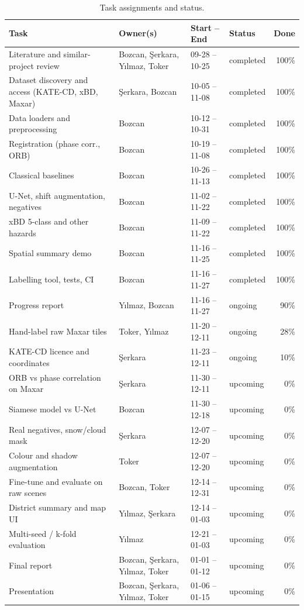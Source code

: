 \documentclass[14pt]{article}
\begin{document}
\begin{table}[H]
\centering\scriptsize
\caption{Task assignments and status.}\label{tab:status}
\begin{tabularx}{\linewidth}{@{}Xlllr@{}}
\toprule
Task & Owner(s) & Start -- End & Status & Done\\
\midrule
Literature and similar-project review & Bozcan, \c{S}erkara, Y{\i}lmaz, Toker & 09-28 -- 10-25 & completed & 100\%\\
Dataset discovery and access (KATE-CD, xBD, Maxar) & \c{S}erkara, Bozcan & 10-05 -- 11-08 & completed & 100\%\\
Data loaders and preprocessing & Bozcan & 10-12 -- 10-31 & completed & 100\%\\
Registration (phase corr., ORB) & Bozcan & 10-19 -- 11-08 & completed & 100\%\\
Classical baselines & Bozcan & 10-26 -- 11-13 & completed & 100\%\\
U-Net, shift augmentation, negatives & Bozcan & 11-02 -- 11-22 & completed & 100\%\\
xBD 5-class and other hazards & Bozcan & 11-09 -- 11-22 & completed & 100\%\\
Spatial summary demo & Bozcan & 11-16 -- 11-25 & completed & 100\%\\
Labelling tool, tests, CI & Bozcan & 11-16 -- 11-27 & completed & 100\%\\
Progress report & Y{\i}lmaz, Bozcan & 11-16 -- 11-27 & ongoing & 90\%\\
Hand-label raw Maxar tiles & Toker, Y{\i}lmaz & 11-20 -- 12-11 & ongoing & 28\%\\
KATE-CD licence and coordinates & \c{S}erkara & 11-23 -- 12-11 & ongoing & 10\%\\
ORB vs phase correlation on Maxar & \c{S}erkara & 11-30 -- 12-11 & upcoming & 0\%\\
Siamese model vs U-Net & Bozcan & 11-30 -- 12-18 & upcoming & 0\%\\
Real negatives, snow/cloud mask & \c{S}erkara & 12-07 -- 12-20 & upcoming & 0\%\\
Colour and shadow augmentation & Toker & 12-07 -- 12-20 & upcoming & 0\%\\
Fine-tune and evaluate on raw scenes & Bozcan, Toker & 12-14 -- 12-31 & upcoming & 0\%\\
District summary and map UI & Y{\i}lmaz, \c{S}erkara & 12-14 -- 01-03 & upcoming & 0\%\\
Multi-seed / k-fold evaluation & Y{\i}lmaz & 12-21 -- 01-03 & upcoming & 0\%\\
Final report & Bozcan, \c{S}erkara, Y{\i}lmaz, Toker & 01-01 -- 01-12 & upcoming & 0\%\\
Presentation & Bozcan, \c{S}erkara, Y{\i}lmaz, Toker & 01-06 -- 01-15 & upcoming & 0\%\\
\bottomrule
\end{tabularx}
\end{table}
\end{document}
